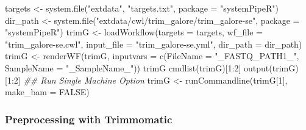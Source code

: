 \documentclass[14pt,]{article}
\newcommand{\hlnum}[1]{\textcolor[rgb]{0.816,0.125,0.439}{#1}}%
\newcommand{\hlstr}[1]{\textcolor[rgb]{0.251,0.627,0.251}{#1}}%
\newcommand{\hlcom}[1]{\textcolor[rgb]{0.502,0.502,0.502}{\textit{#1}}}%
\newcommand{\hlopt}[1]{\textcolor[rgb]{0,0,0}{#1}}%
\newcommand{\hlstd}[1]{\textcolor[rgb]{0.251,0.251,0.251}{#1}}%
\newcommand{\hlkwc}[1]{\textcolor[rgb]{0.251,0.251,0.251}{#1}}%
\newcommand{\hlkwd}[1]{\textcolor[rgb]{0.878,0.439,0.125}{#1}}%
\newenvironment{Shaded}{\begin{myshaded}}{\end{myshaded}}
\newcommand{\KeywordTok}[1]{\hlkwd{#1}}
\newcommand{\DataTypeTok}[1]{\hlkwc{#1}}
\newcommand{\DecValTok}[1]{\hlnum{#1}}
\newcommand{\StringTok}[1]{\hlstr{#1}}
\newcommand{\CommentTok}[1]{\hlcom{#1}}
\newcommand{\OtherTok}[1]{{#1}}
\newcommand{\OperatorTok}[1]{\hlopt{#1}}
\newcommand{\NormalTok}[1]{\hlstd{#1}}
\begin{document}
\begin{Shaded}
\begin{Highlighting}[]
\NormalTok{targets <-}\StringTok{ }\KeywordTok{system.file}\NormalTok{(}\StringTok{"extdata"}\NormalTok{, }\StringTok{"targets.txt"}\NormalTok{, }\DataTypeTok{package =} \StringTok{"systemPipeR"}\NormalTok{)}
\NormalTok{dir_path <-}\StringTok{ }\KeywordTok{system.file}\NormalTok{(}\StringTok{"extdata/cwl/trim_galore/trim_galore-se"}\NormalTok{, }\DataTypeTok{package =} \StringTok{"systemPipeR"}\NormalTok{)}
\NormalTok{trimG <-}\StringTok{ }\KeywordTok{loadWorkflow}\NormalTok{(}\DataTypeTok{targets =}\NormalTok{ targets, }\DataTypeTok{wf_file =} \StringTok{"trim_galore-se.cwl"}\NormalTok{, }\DataTypeTok{input_file =} \StringTok{"trim_galore-se.yml"}\NormalTok{, }
    \DataTypeTok{dir_path =}\NormalTok{ dir_path)}
\NormalTok{trimG <-}\StringTok{ }\KeywordTok{renderWF}\NormalTok{(trimG, }\DataTypeTok{inputvars =} \KeywordTok{c}\NormalTok{(}\DataTypeTok{FileName =} \StringTok{"_FASTQ_PATH1_"}\NormalTok{, }\DataTypeTok{SampleName =} \StringTok{"_SampleName_"}\NormalTok{))}
\NormalTok{trimG}
\KeywordTok{cmdlist}\NormalTok{(trimG)[}\DecValTok{1}\OperatorTok{:}\DecValTok{2}\NormalTok{]}
\KeywordTok{output}\NormalTok{(trimG)[}\DecValTok{1}\OperatorTok{:}\DecValTok{2}\NormalTok{]}
\CommentTok{## Run Single Machine Option}
\NormalTok{trimG <-}\StringTok{ }\KeywordTok{runCommandline}\NormalTok{(trimG[}\DecValTok{1}\NormalTok{], }\DataTypeTok{make_bam =} \OtherTok{FALSE}\NormalTok{)}
\end{Highlighting}
\end{Shaded}

\hypertarget{preprocessing-with-trimmomatic}{%
\subsubsection{Preprocessing with Trimmomatic}\label{preprocessing-with-trimmomatic}}
\end{document}
